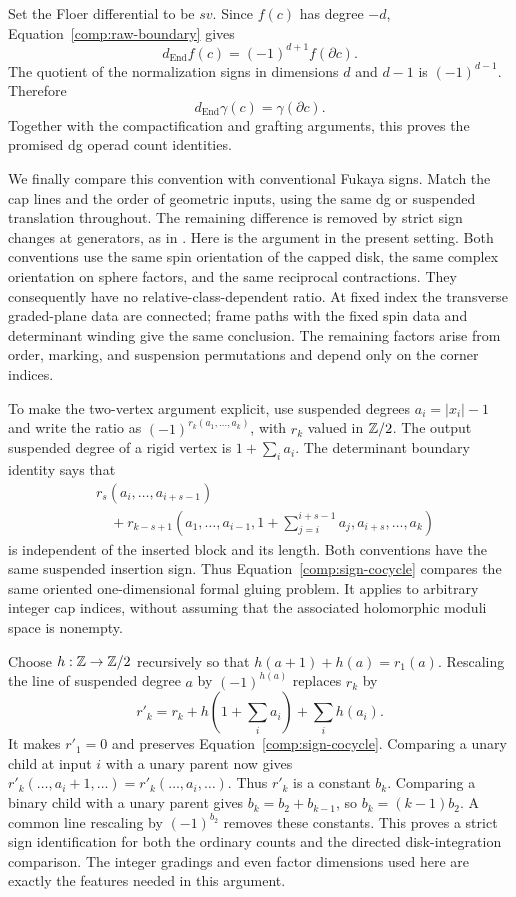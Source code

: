 Set the Floer differential to be $s v$.  Since $f(c)$ has degree
$-d$, Equation~\eqref{comp:raw-boundary} gives
\[
 d_{\mathrm{End}}f(c)=(-1)^{d+1}f(\partial c).
\]
The quotient of the normalization signs in dimensions $d$ and
$d-1$ is $(-1)^{d-1}$.  Therefore
\begin{equation}
 d_{\mathrm{End}}\gamma(c)=\gamma(\partial c).
 \label{comp:dg-count}
\end{equation}
Together with the compactification and grafting arguments, this
proves the promised dg operad count identities.

We finally compare this convention with conventional Fukaya
signs.  Match the cap lines and the order of geometric inputs,
using the same dg or suspended translation throughout.  The
remaining difference is removed by strict sign changes at
generators, as in \cite[Lemma~7.7]{A8}.  Here is the argument in the
present setting.  Both conventions use the same spin orientation
of the capped disk, the same complex orientation on sphere
factors, and the same reciprocal contractions.  They consequently
have no relative-class-dependent ratio.  At fixed index the
transverse graded-plane data are connected; frame paths with the
fixed spin data and determinant winding give the same conclusion.
The remaining factors arise from order, marking, and suspension
permutations and depend only on the corner indices.

To make the two-vertex argument explicit, use suspended degrees
$a_i=|x_i|-1$ and write the ratio as
$(-1)^{r_k(a_1,\ldots,a_k)}$, with $r_k$ valued in $\mathbb Z/2$.
The output suspended degree of a rigid vertex is
$1+\sum_i a_i$.  The determinant boundary identity says that
\begin{equation}
 \begin{split}
 &r_s(a_i,\ldots,a_{i+s-1})\\
 &\quad+r_{k-s+1}\left(a_1,\ldots,a_{i-1},
     1+\sum_{j=i}^{i+s-1}a_j,a_{i+s},\ldots,a_k\right)
 \end{split}
 \label{comp:sign-cocycle}
\end{equation}
is independent of the inserted block and its length.  Both
conventions have the same suspended insertion sign.  Thus
Equation~\eqref{comp:sign-cocycle} compares the same oriented
one-dimensional formal gluing problem.  It applies to arbitrary
integer cap indices, without assuming that the associated
holomorphic moduli space is nonempty.

Choose $h:\mathbb Z\to\mathbb Z/2$ recursively so that
$h(a+1)+h(a)=r_1(a)$.  Rescaling the line of suspended degree $a$
by $(-1)^{h(a)}$ replaces $r_k$ by
\[
 r'_k=r_k+h\left(1+\sum_i a_i\right)+\sum_i h(a_i).
\]
It makes $r'_1=0$ and preserves
Equation~\eqref{comp:sign-cocycle}.  Comparing a unary child at
input $i$ with a unary parent now gives
$r'_k(\ldots,a_i+1,\ldots)=r'_k(\ldots,a_i,\ldots)$.
Thus $r'_k$ is a constant $b_k$.  Comparing a binary child with a
unary parent gives $b_k=b_2+b_{k-1}$, so $b_k=(k-1)b_2$.
A common line rescaling by $(-1)^{b_2}$ removes these constants.
This proves a strict sign identification for both the ordinary
counts and the directed disk-integration comparison.  The
integer gradings and even factor dimensions used here are exactly
the features needed in this argument.

